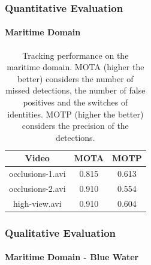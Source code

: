 \begin{frame}
	\frametitle{Quantitative Evaluation}
	\framesubtitle{Maritime Domain}
	
	\large
	
	\begin{table}[!t]
		\renewcommand{\arraystretch}{1.3}
		\caption{\large Tracking performance on the maritime domain. MOTA (higher the better) considers
				 the number of missed detections, the number of false positives and the switches of
				 identities. MOTP (higher the better) considers the precision of the detections.}
		\centering
		\vspace{0.2cm}
		
		\begin{tabular}{ccc}
			\hline
			\hline
			\textbf{Video} & \textbf{MOTA} & \textbf{MOTP} \\
			\hline
			occlusions-1.avi & 0.815 & 0.613 \\
			\hline
			occlusions-2.avi & 0.910 & 0.554 \\
			\hline
			high-view.avi & 0.910 & 0.604 \\
			\hline
		\hline
		\end{tabular}
	\end{table}
\end{frame}

\begin{frame}
	\frametitle{Qualitative Evaluation}
	\framesubtitle{Maritime Domain - Blue Water}
	
	\begin{figure}[!h]
		\centering
	\end{figure}
\end{frame}

